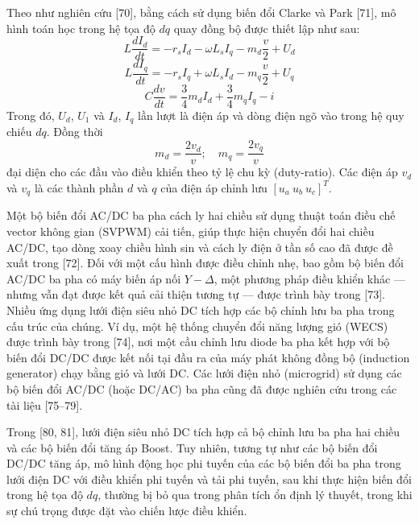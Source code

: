 Theo như nghiên cứu [70], bằng cách sử dụng biến đổi Clarke và Park [71], mô hình toán học trong hệ tọa độ \(dq\) quay đồng bộ được thiết lập như sau:
\begin{equation} \label{E2_9}
    L \frac{dI_d}{dt} = -r_s I_d - \omega L_s I_q - m_d \frac{v}{2} + U_d
\end{equation}
\begin{equation} \label{E2_10}
    L \frac{dI_q}{dt} = -r_s I_q + \omega L_s I_d - m_q \frac{v}{2} + U_q
\end{equation}
\begin{equation} \label{E2_11}
    C \frac{dv}{dt} = \frac{3}{4} m_d I_d + \frac{3}{4} m_q I_q - i
\end{equation}
\noindent Trong đó, \(U_d\), \(U_1\) và \(I_d\), \(I_q\) lần lượt là điện áp và dòng điện ngõ vào trong hệ quy chiếu \(dq\). Đồng thời
\begin{equation} \label{E2_12}
    m_d = \frac{2v_d}{v}; \quad m_q = \frac{2v_q}{v}
\end{equation}
\noindent đại diện cho các đầu vào điều khiển theo tỷ lệ chu kỳ (duty-ratio). Các điện áp \( v_d \) và \( v_q \) là các thành phần \(d\) và \(q\) của điện áp chỉnh lưu \( [u_a\ u_b\ u_c]^T \). \par
Một bộ biến đổi AC/DC ba pha cách ly hai chiều sử dụng thuật toán điều chế vector không gian (SVPWM) cải tiến, giúp thực hiện chuyển đổi hai chiều AC/DC, tạo dòng xoay chiều hình sin và cách ly điện ở tần số cao đã được đề xuất trong [72]. Đối với một cấu hình được điều chỉnh nhẹ, bao gồm bộ biến đổi AC/DC ba pha có máy biến áp nối \( Y - \Delta \), một phương pháp điều khiển khác — nhưng vẫn đạt được kết quả cải thiện tương tự — được trình bày trong [73]. Nhiều ứng dụng lưới điện siêu nhỏ DC tích hợp các bộ chỉnh lưu ba pha trong cấu trúc của chúng. Ví dụ, một hệ thống chuyển đổi năng lượng gió (WECS) được trình bày trong [74], nơi một cầu chỉnh lưu diode ba pha kết hợp với bộ biến đổi DC/DC được kết nối tại đầu ra của máy phát không đồng bộ (induction generator) chạy bằng gió và lưới DC. Các lưới điện nhỏ (microgrid) sử dụng các bộ biến đổi AC/DC (hoặc DC/AC) ba pha cũng đã được nghiên cứu trong các tài liệu [75–79]. \par
Trong [80, 81], lưới điện siêu nhỏ DC tích hợp cả bộ chỉnh lưu ba pha hai chiều và các bộ biến đổi tăng áp Boost. Tuy nhiên, tương tự như các bộ biến đổi DC/DC tăng áp, mô hình động học phi tuyến của các bộ biến đổi ba pha trong lưới điện DC với điều khiển phi tuyến và tải phi tuyến, sau khi thực hiện biến đổi trong hệ tọa độ \(dq\), thường bị bỏ qua trong phân tích ổn định lý thuyết, trong khi sự chú trọng được đặt vào chiến lược điều khiển.
